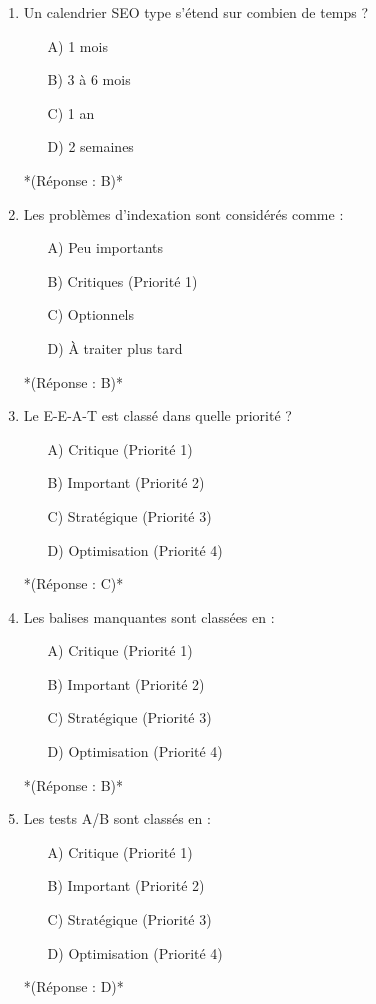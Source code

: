 \documentclass[12pt,a4paper,twoside]{report}
\begin{document}
\begin{enumerate}
    \item Un calendrier SEO type s'étend sur combien de temps ?
    \begin{itemize}
        \item[A)] 1 mois
        \item[B)] 3 à 6 mois
        \item[C)] 1 an
        \item[D)] 2 semaines
    \end{itemize}
    *(Réponse : B)*

    \item Les problèmes d'indexation sont considérés comme :
    \begin{itemize}
        \item[A)] Peu importants
        \item[B)] Critiques (Priorité 1)
        \item[C)] Optionnels
        \item[D)] À traiter plus tard
    \end{itemize}
    *(Réponse : B)*

    \item Le E-E-A-T est classé dans quelle priorité ?
    \begin{itemize}
        \item[A)] Critique (Priorité 1)
        \item[B)] Important (Priorité 2)
        \item[C)] Stratégique (Priorité 3)
        \item[D)] Optimisation (Priorité 4)
    \end{itemize}
    *(Réponse : C)*

    \item Les balises manquantes sont classées en :
    \begin{itemize}
        \item[A)] Critique (Priorité 1)
        \item[B)] Important (Priorité 2)
        \item[C)] Stratégique (Priorité 3)
        \item[D)] Optimisation (Priorité 4)
    \end{itemize}
    *(Réponse : B)*

    \item Les tests A/B sont classés en :
    \begin{itemize}
        \item[A)] Critique (Priorité 1)
        \item[B)] Important (Priorité 2)
        \item[C)] Stratégique (Priorité 3)
        \item[D)] Optimisation (Priorité 4)
    \end{itemize}
    *(Réponse : D)*


\end{enumerate}
\end{document}
